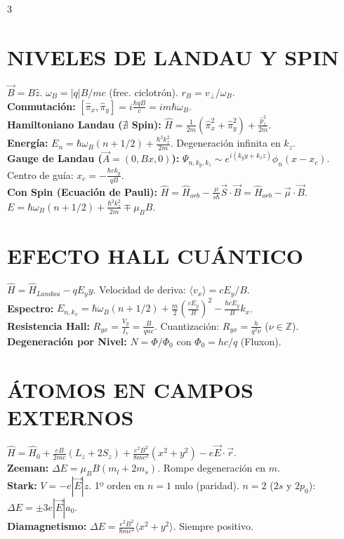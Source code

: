 \documentclass[8pt,a4paper,fleqn]{extarticle} %
\begin{document}
\begin{multicols}{3}
\section{NIVELES DE LANDAU Y SPIN}
$\vec{B} = B\hat{z}$. $\omega_B = |q|B/mc$ (frec. ciclotrón). $r_B = v_\perp/\omega_B$.\\
\textbf{Conmutación:} $[\hat{\pi}_x, \hat{\pi}_y] = i \frac{\hbar q B}{c} = i m \hbar \omega_B$.\\
\textbf{Hamiltoniano Landau ($\nexists$ Spin):} $\hat{H} = \frac{1}{2m}(\hat{\pi}_x^2 + \hat{\pi}_y^2) + \frac{\hat{p}_z^2}{2m}$.\\
\textbf{Energía:} $E_n = \hbar \omega_B (n + 1/2) + \frac{\hbar^2 k_z^2}{2m}$. Degeneración infinita en $k_z$.\\
\textbf{Gauge de Landau ($\vec{A} = (0, Bx, 0)$):} $\Psi_{n, k_y, k_z} \sim e^{i(k_y y + k_z z)} \phi_n(x - x_c)$.\\
Centro de guía: $x_c = -\frac{\hbar c k_y}{qB}$.\\
\textbf{Con Spin (Ecuación de Pauli):} $\hat{H} = \hat{H}_{orb} - \frac{\mu}{s\hbar} \vec{S}\cdot\vec{B} = \hat{H}_{orb} - \vec{\mu}\cdot\vec{B}$.\\
$E = \hbar \omega_B (n + 1/2) + \frac{\hbar^2 k_z^2}{2m} \mp \mu_B B$.

\section{EFECTO HALL CUÁNTICO}
$\hat{H} = \hat{H}_{Landau} - q E_y y$. Velocidad de deriva: $\langle v_x \rangle = c E_y/B$.\\
\textbf{Espectro:} $E_{n, k_x} = \hbar \omega_B (n + 1/2) + \frac{m}{2}(\frac{c E_y}{B})^2 - \frac{\hbar c E_y}{B} k_x$.\\
\textbf{Resistencia Hall:} $R_{yx} = \frac{V_y}{I_x} = \frac{B}{qnc}$. Cuantización: $R_{yx} = \frac{h}{q^2 \nu}$ ($\nu \in \mathbb{Z}$).\\
\textbf{Degeneración por Nivel:} $N = \Phi/\Phi_0$ con $\Phi_0 = hc/q$ (Fluxon).

\section{ÁTOMOS EN CAMPOS EXTERNOS}
$\hat{H} = \hat{H}_0 + \frac{eB}{2mc}(L_z + 2S_z) + \frac{e^2 B^2}{8mc^2}(x^2 + y^2) - e \vec{E}\cdot\vec{r}$.\\
\textbf{Zeeman:} $\Delta E = \mu_B B (m_l + 2m_s)$. Rompe degeneración en $m$.\\
\textbf{Stark:} $V = -e|\vec{E}|z$. 1º orden en $n=1$ nulo (paridad). $n=2$ ($2s$ y $2p_0$): $\Delta E = \pm 3 e |\vec{E}| a_0$.\\
\textbf{Diamagnetismo:} $\Delta E = \frac{e^2 B^2}{8mc^2} \langle x^2 + y^2 \rangle$. Siempre positivo.



\end{multicols}
\end{document}
